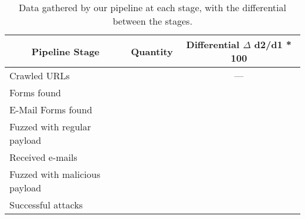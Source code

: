 \begin{table*}[!htbp]
	\centering
	\begin{tabular}{|l|c|c|}
		\hline
		\multicolumn{1}{|c|}{\textbf{Pipeline Stage}} &
		\multicolumn{1}{p{3cm}|}{\centering \textbf{Quantity}} &
		\multicolumn{1}{p{2.8cm}|}{\centering \textbf{Differential}
		$\Delta$ d2/d1 * 100}\\
		\hline
		Crawled URLs  & \urls &  --- \\
		\hline
		Forms found  & \forms & \formsDelta \\
		\hline
		E-Mail Forms found  & \emailforms & \emailformsDelta \\
		\hline
		Fuzzed with regular payload  & \fuzzed & \fuzzedDelta \\
		\hline
		Received e-mails  & \recd & \recdDelta \\
		\hline
		Fuzzed with malicious payload  & \malfuzzed & \malfuzzedDelta \\
		\hline
		Successful attacks  & \success & \successDelta \\
		\hline

	\end{tabular}
	\caption[]{Data gathered by our pipeline at each stage, with the differential between the stages.}
	\label{tab:pipeline}
\end{table*}